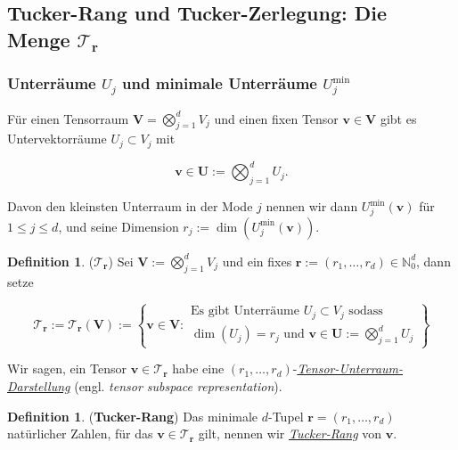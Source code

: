 \documentclass[11pt]{article} %
\theoremstyle{definition}
\newtheorem{definition}[thm]{Definition}
\numberwithin{equation}{section}
\begin{document}
\subsection{Tucker-Rang und Tucker-Zerlegung: Die Menge $\mathcal{T}_{\mathbf{r}}$}

\subsubsection{Unterräume $U_{j}$ und minimale Unterräume $U_{j}^{\min}$}
\begin{changemargin}{0pt}{0pt}

Für einen Tensorraum $\mathbf{V} = \bigotimes^{d}_{j=1} V_{j}$ und einen fixen Tensor $\mathbf{v} \in \mathbf{V}$ gibt es
Untervektorräume $U_{j} \subset V_{j}$ mit

\begin{equation}
\mathbf{v} \in \mathbf{U} := \bigotimes^{d}_{j=1} U_{j}.
\end{equation}

Davon den kleinsten Unterraum in der Mode $j$ nennen wir dann $U^{\min}_{j}(\mathbf{v})$ für $1\leq j\leq d$, und seine Dimension
$r_{j} := \dim(U_{j}^{\min}(\mathbf{v})).$

\begin{definition}($\mathcal{T}_{\mathbf{r}}$)
Sei $\mathbf{V} := \bigotimes^{d}_{j=1} V_{j}$ und ein fixes $\mathbf{r} := (r_{1},\dots,r_{d})\in \mathbb{N}^{d}_{0}$, dann setze

\begin{equation}
\mathcal{T}_{\mathbf{r}} := \mathcal{T}_{\mathbf{r}}(\mathbf{V}) := 
\left\{ \mathbf{v}\in \mathbf{V} : 
\begin{aligned}
\text{Es gibt Unterräume } U_{j} \subset V_{j} \text{ sodass }\\
\dim(U_{j}) = r_{j} \text{ und } \mathbf{v} \in \mathbf{U} := \bigotimes^{d}_{j=1} U_{j}
\end{aligned} 
\right\}
\end{equation}
\end{definition}

Wir sagen, ein Tensor $\mathbf{v} \in \mathcal{T}_{\mathbf{r}}$ habe eine $(r_{1},\dots,r_{d})$-\textit{\underline{Tensor-Unterraum-Darstellung}}
(engl. \textit{tensor subspace representation}).

\begin{definition} (\textbf{Tucker-Rang})
Das minimale $d$-Tupel $\mathbf{r} = (r_{1},\dots,r_{d})$ natürlicher Zahlen, für das $\mathbf{v} \in \mathcal{T}_{\mathbf{r}}$ gilt, nennen wir
\textit{\underline{Tucker-Rang}} von $\mathbf{v}$.
\end{definition}

\end{changemargin}
\end{document}
